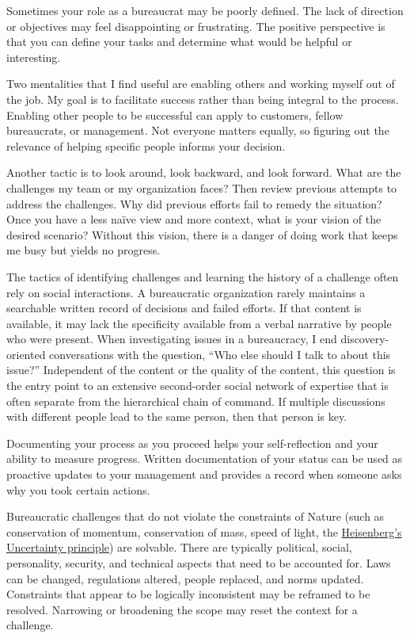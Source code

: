 Sometimes your role as a bureaucrat may be poorly defined. The lack of direction or objectives may feel disappointing or frustrating. The positive perspective is that you can define your tasks and determine what would be helpful or interesting. 

Two mentalities that I find useful are enabling others and working myself out of the job. My goal is to facilitate success rather than being integral to the process. Enabling other people to be successful can apply to customers, fellow bureaucrats, or management. Not everyone matters equally, so figuring out the relevance of helping specific people informs your decision. 

Another tactic is to look around, look backward, and look forward. What are the challenges my team or my organization faces? Then review previous attempts to address the challenges. Why did previous efforts fail to remedy the situation? Once you have a less na\"ive view and more context, what is your vision of the desired scenario? Without this vision, there is a danger of doing work that keeps me busy but yields no progress. 

The tactics of identifying challenges and learning the history of a challenge often rely on social interactions. A bureaucratic organization rarely maintains a searchable written record of decisions and failed efforts. If that content is available, it may lack the specificity available from a verbal narrative by people who were present. When investigating issues in a bureaucracy, I end discovery-oriented conversations with the question, ``Who else should I talk to about this issue?'' Independent of the content or the quality of the content, this question is the entry point to an extensive second-order social network of expertise that is often separate from the hierarchical chain of command. If multiple  discussions with different people lead to the same person, then that person is key. 

Documenting your process as you proceed helps  your self-reflection and your ability to measure progress. Written documentation of your status can be used as proactive updates to your management and provides a record when someone asks  why you took certain actions.

Bureaucratic challenges that do not violate the constraints of Nature (such as conservation of momentum, conservation of mass, speed of light, the \href{https://en.wikipedia.org/wiki/Uncertainty_principle}{Heisenberg's Uncertainty principle}) 
are solvable. There are typically political, social, personality, security, and technical aspects that need to be accounted for. Laws can be changed, regulations altered, people replaced, and norms updated. Constraints that appear to be logically inconsistent may be reframed to be resolved. Narrowing or broadening the scope may reset the context for a challenge.



